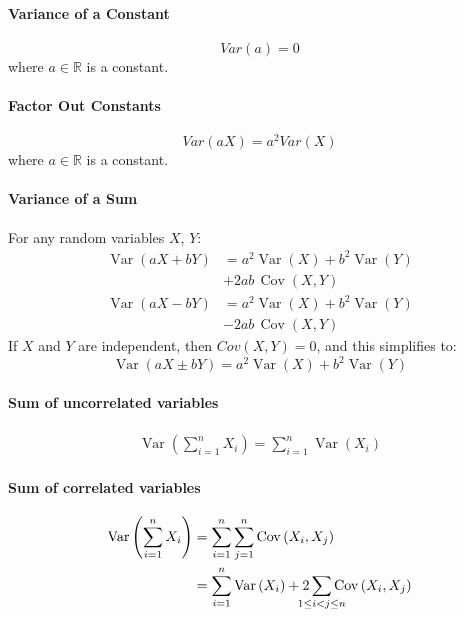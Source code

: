 \documentclass[8pt, a4paper, landscape, includeheadfoot]{extarticle}
\begin{document}
\begin{multicols*}{4}
	\paragraph{Variance of a Constant}
	$$
		Var(a) = 0
	$$
	where \(a\in\mathbb{R}\) is a constant.

	\paragraph{Factor Out Constants}
	$$
		Var(aX) = a^2 Var(X)
	$$
	where \(a\in\mathbb{R}\) is a constant.

	\paragraph{Variance of a Sum}
	For any random variables \(X\), \(Y\):
	\begin{align*}
		\operatorname{Var}(aX + bY) & =a^2\operatorname{Var}(X)+b^2\operatorname{Var}(Y) \\
		                            & +2ab\, \operatorname{Cov}(X,Y)                     \\
		\operatorname{Var}(aX - bY) & =a^2\operatorname{Var}(X)+b^2\operatorname{Var}(Y) \\
		                            & -2ab\, \operatorname{Cov}(X,Y)
	\end{align*}
	If \(X\) and \(Y\) are independent, then \(Cov(X, Y) = 0\), and this simplifies to:
	$$
		\operatorname{Var}(aX \pm bY) =a^2\operatorname{Var}(X)+b^2\operatorname{Var}(Y)
	$$

	\paragraph{Sum of uncorrelated variables}

	\begin{align*}
		\operatorname{Var}\left(\sum_{i=1}^n X_i\right) = \sum_{i=1}^n \operatorname{Var}(X_i)
	\end{align*}

	\paragraph{Sum of correlated variables}
	\begin{align*}
		\operatorname{Var}\left(\sum_{i=1}^n X_i\right) & = \sum_{i=1}^n \sum_{j=1}^n \operatorname{Cov}\left(X_i, X_j\right)                                                                    \\
		                                                & = \sum_{i=1}^n \operatorname{Var}\left(X_i\right) + 2\hskip-10pt\sum_{1\le i<j\le n}\hskip-10pt\operatorname{Cov}\left(X_i, X_j\right)
	\end{align*}


\end{multicols*}
\end{document}
